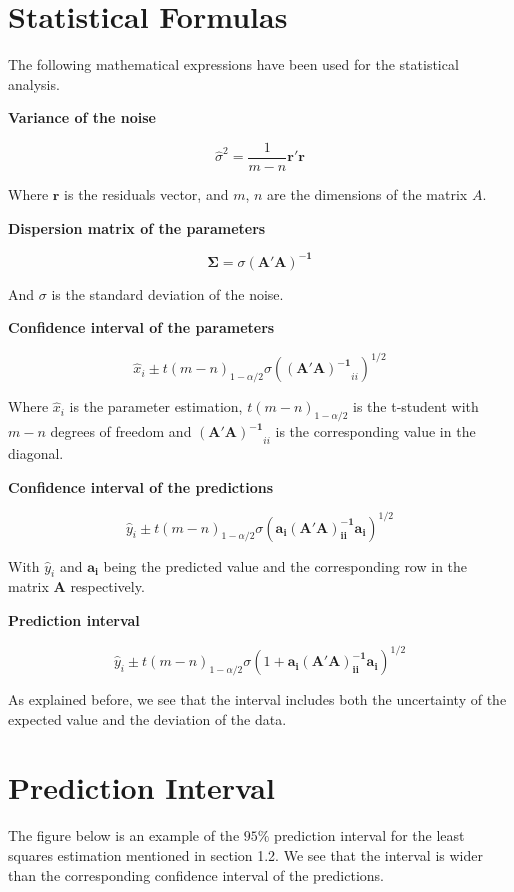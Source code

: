 \section{Statistical Formulas}
\label{stats:formulas}
The following mathematical expressions have been used for the statistical analysis.

\textbf{\large{Variance of the noise}}

\[
\hat{\sigma}^2 = \frac{1}{m-n} \mathbf{r}' \mathbf{r}
\]

Where $\mathbf{r}$ is the residuals vector, and $m$, $n$ are the dimensions of the matrix $A$.


\textbf{\large{Dispersion matrix of the parameters}}

\[
\mathbf{\Sigma} = \sigma \mathbf{(A' A)^{-1}}
\]

And $\sigma$ is the standard deviation of the noise.


\textbf{\large{Confidence interval of the parameters}}

\[
\hat{x}_i \pm t(m-n)_{1-\alpha / 2} \sigma (\mathbf{(A' A)^{-1}}_{ii})^{1/2} 
\]

Where $\hat{x}_i$ is the parameter estimation, $t(m-n)_{1-\alpha / 2}$ is the t-student with $m - n$ degrees of freedom and $\mathbf{(A' A)^{-1}}_{ii}$ is the corresponding value in the diagonal.


\textbf{\large{Confidence interval of the predictions}}
  
\[
\hat{y}_i \pm t(m-n)_{1-\alpha / 2} \sigma (\mathbf{a_i(A' A)^{-1}_{ii}a_i})^{1/2} 
\]

With $\hat{y}_i$ and $\mathbf{a_i}$ being the predicted value and the corresponding row in the matrix $\mathbf{A}$ respectively.


\textbf{\large{Prediction interval}}
  
\[
\hat{y}_i \pm t(m-n)_{1-\alpha / 2} \sigma (1+\mathbf{a_i(A' A)^{-1}_{ii}a_i})^{1/2} 
\]

As explained before, we see that the interval includes both the uncertainty of the expected value and the deviation of the data. 

\newpage
\section{Prediction Interval}
\label{pred:interval}


The figure below is an example of the $95 \%$ prediction interval for the least squares estimation mentioned in section 1.2. We see that the interval is wider than the corresponding confidence interval of the predictions.

